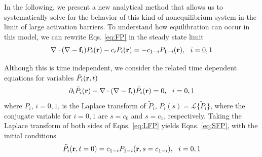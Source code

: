 \documentclass[11pt]{ucthesis}
\def\br{{\bf r}}
\def\bof{{\bf f}}
\begin{document}
In the following, we present a new analytical method that allows us to systematically solve for the behavior of this kind of nonequilibrium system in the limit of large activation barriers. To understand how equilibration can occur in this model, we can rewrite 
Eqs. \ref{eq:FP} in the steady state limit
%
\begin{equation}
\label{eq:SFP}
\nabla \cdot (\nabla - \bof_i)P_i(\br) - c_i P_i(\br) = -c_{1-i} P_{1-i}(\br), ~~ i=0,1
\end{equation}

Although this is time independent, we consider the related time dependent equations for
variables $\tilde{P}_i(\br, t)$
\begin{equation}
\label{eq:LFP}
 \partial_t \tilde{P}_i(\br)-\nabla \cdot (\nabla - \bof_i)\tilde{P}_i(\br)  = 0, ~~ i = 0,1
\end{equation}
where $P_i$, $i=0,1$, is the Laplace transform of $\tilde{P}_i$, $P_i(s) = \mathcal{L} \{\tilde{P}_i\}$, where the conjugate variable
for $i=0,1$ are $s =c_0$ and $s = c_1$, respectively. Taking the Laplace transform of both sides of Eqns. \ref{eq:LFP} yields Eqns. \ref{eq:SFP}, with the initial conditions 
\begin{equation}
\label{eq:IFP}
\tilde{P}_{i}(\br,t=0) = c_{1-i} P_{1-i}(\br,s=c_{1-i}) , ~~ i=0,1
\end{equation}
\end{document}

